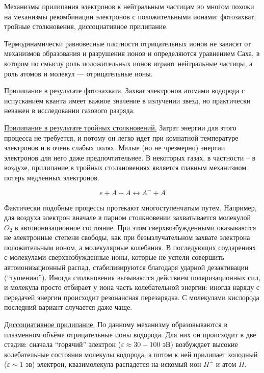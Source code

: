 \documentclass[10pt, a4paper]{article}
\begin{document}
Механизмы прилипания электронов к нейтральным частицам во многом похожи на механизмы рекомбинации электронов с положительными ионами: фотозахват, тройные столкновения, диссоциативное прилипание.
 
Термодинамически равновесные плотности отрицательных ионов не зависят от механизмов образования и разрушения ионов и определяются уравнением Саха, в котором по смыслу роль положительных ионов играют нейтральные частицы, а роль атомов и молекул — отрицательные ионы.

\uline{Прилипание в результате фотозахвата.} Захват электронов атомами водорода с испусканием кванта имеет важное значение в излучении звезд, но практически неважен в исследовании газового разряда.

\uline{Прилипание в результате тройных столкновений.} Затрат энергии для этого процесса не требуется, и потому он легко идет при комнатной температуре электронов и в очень слабых полях. Малые (но не чрезмерно) энергии электронов для него даже предпочтительнее. В некоторых газах, в частности -- в воздухе, прилипание в тройных столкновениях является главным механизмом потерь медленных электронов.

\begin{equation*}
	e + A + A \leftrightarrow A^{-} + A
\end{equation*}

Фактически подобные процессы протекают многоступенчатым путем. Например, для воздуха электрон вначале в парном столкновении захватывается молекулой $O_2$ в автоионизационное состояние. При этом сверхвозбужденными оказываются не электронные степени свободы, как при безызлучательном захвате электрона положительным ионом, а молекулярные колебания. В последующих соударениях с молекулами сверхвозбужденные ионы, которые не успели совершить автоионизационный распад, стабилизируются благодаря ударной дезактивации (``тушению''). Иногда столкновения вызываются действием поляризационных сил, и молекула просто отбирает у иона часть колебательной энергии: иногда наряду с передачей энергии происходит резонансная перезарядка. С молекулами кислорода последний вариант случается даже чаще.

\uline{Диссоциативное прилипание.} По данному механизму образовываются в плазменном объёме отрицательные ионы водорода. Для них он происходит в две стадии: сначала ``горячий'' электрон ($\varepsilon \approx 30-100$ эВ) возбуждает высокие колебательные состояния молекулы водорода, а потом к ней прилипает холодный ($\varepsilon \sim 1$ эв) электрон, квазимолекула распадется на искомый ион $H^{-}$ и атом $H$.
\end{document}
